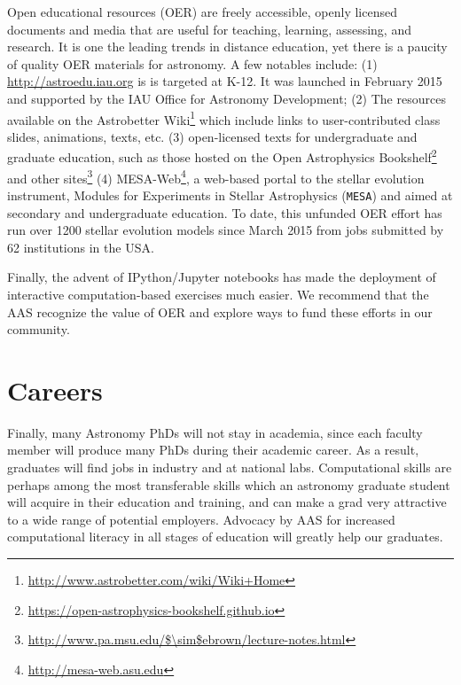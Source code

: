 \documentclass[11pt]{article}
\begin{document}
Open educational resources (OER) are freely accessible, openly
licensed documents and media that are useful for teaching, learning,
assessing, and research. It is one the leading trends in distance
education, yet there is a paucity of quality OER materials for
astronomy. A few notables include: (1)
\href{http://astroedu.iau.org}{http://astroedu.iau.org} is is targeted
at K-12. It was launched in February 2015 and supported by the IAU
Office for Astronomy Development; (2) The resources available on the
Astrobetter
Wiki\footnote{\url{http://www.astrobetter.com/wiki/Wiki+Home}} which
include links to user-contributed class slides, animations, texts,
etc. (3) open-licensed texts for undergraduate and graduate education,
such as those hosted on the Open Astrophysics
Bookshelf\footnote{\url{https://open-astrophysics-bookshelf.github.io}}
and other
sites\footnote{\url{http://www.pa.msu.edu/$\sim$ebrown/lecture-notes.html}}
(4) MESA-Web\footnote{\url{http://mesa-web.asu.edu}}, a
web-based portal to the stellar evolution instrument, Modules for
Experiments in Stellar Astrophysics ({\tt MESA}) and aimed at
secondary and undergraduate education. To date, this unfunded OER
effort has run over 1200 stellar evolution models since March 2015
from jobs submitted by 62 institutions in the USA.

Finally, the advent of IPython/Jupyter notebooks has made the
deployment of interactive computation-based exercises much easier.  We
recommend that the AAS recognize the value of OER and explore ways to
fund these efforts in our community.

\section{Careers}

Finally, many Astronomy PhDs will not stay in academia, since each
faculty member will produce many PhDs during their academic career.
As a result, graduates will find jobs in industry and at national
labs. Computational skills are perhaps among the most transferable
skills which an astronomy graduate student will acquire in their
education and training, and can make a grad very attractive to a wide
range of potential employers.  Advocacy by AAS for increased
computational literacy in all stages of education will greatly help
our graduates.
\end{document}
